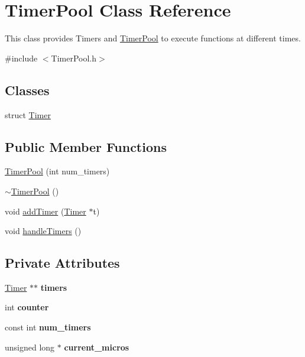 \hypertarget{class_timer_pool}{}\section{Timer\+Pool Class Reference}
\label{class_timer_pool}


This class provides Timers and \hyperlink{class_timer_pool}{Timer\+Pool} to execute functions at different times.  




{\ttfamily \#include $<$Timer\+Pool.\+h$>$}

\subsection*{Classes}
\begin{DoxyCompactItemize}
\item 
struct \hyperlink{struct_timer_pool_1_1_timer}{Timer}
\end{DoxyCompactItemize}
\subsection*{Public Member Functions}
\begin{DoxyCompactItemize}
\item 
\hyperlink{class_timer_pool_a64f48532ae5d7e0e314c3f72b9ebfffe}{Timer\+Pool} (int num\+\_\+timers)
\item 
\hyperlink{class_timer_pool_a2ae48caaa6ba965b6c59e5e9d13b8276}{$\sim$\+Timer\+Pool} ()
\item 
void \hyperlink{class_timer_pool_a06d25c2cdf9bca4418c23cc3d914846f}{add\+Timer} (\hyperlink{struct_timer_pool_1_1_timer}{Timer} $\ast$t)
\item 
void \hyperlink{class_timer_pool_a4476fbaa8e585ec0877e741a5df44fa1}{handle\+Timers} ()
\end{DoxyCompactItemize}
\subsection*{Private Attributes}
\begin{DoxyCompactItemize}
\item 
\mbox{\label{class_timer_pool_a56a1deb30dd7bc5e34c1bb9007deb536}} 
\hyperlink{struct_timer_pool_1_1_timer}{Timer} $\ast$$\ast$ {\bfseries timers}
\item 
\mbox{\label{class_timer_pool_afae27d22b88243b91f584bf1ec717b5c}} 
int {\bfseries counter}
\item 
\mbox{\label{class_timer_pool_a70654a24cc4398da227308622124bc85}} 
const int {\bfseries num\+\_\+timers}
\item 
\mbox{\label{class_timer_pool_acbcca2aa5f8cbf59c4fb90ccaf45316b}} 
unsigned long $\ast$ {\bfseries current\+\_\+micros}
\end{DoxyCompactItemize}


